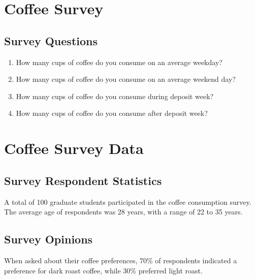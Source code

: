 \section{Coffee Survey}

\subsection{Survey Questions}

\begin{enumerate}
    \item How many cups of coffee do you consume on an average weekday?
    \item How many cups of coffee do you consume on an average weekend day?
    \item How many cups of coffee do you consume during deposit week?
    \item How many cups of coffee do you consume after deposit week?
\end{enumerate}

\section{Coffee Survey Data}

\subsection{Survey Respondent Statistics}
A total of 100 graduate students participated in the coffee consumption survey.
The average age of respondents was 28 years, with a range of 22 to 35 years.
\subsection{Survey Opinions}
When asked about their coffee preferences, 70\% of respondents indicated a
preference for dark roast coffee, while 30\% preferred light roast.